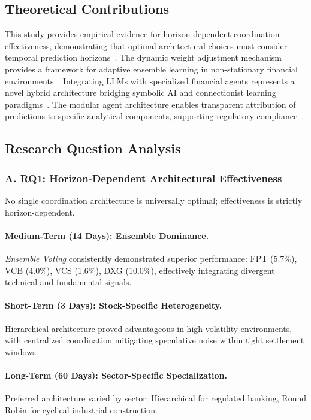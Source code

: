 \documentclass{ieeeaccess}
\begin{document}
\subsection{Theoretical Contributions}
This study provides empirical evidence for horizon-dependent coordination effectiveness, demonstrating that optimal architectural choices must consider temporal prediction horizons~\cite{hansen2001neural}. The dynamic weight adjustment mechanism provides a framework for adaptive ensemble learning in non-stationary financial environments~\cite{gama2014survey}. Integrating LLMs with specialized financial agents represents a novel hybrid architecture bridging symbolic AI and connectionist learning paradigms~\cite{bommasani2021foundation,brown2020language}. The modular agent architecture enables transparent attribution of predictions to specific analytical components, supporting regulatory compliance~\cite{arrieta2020explainable}.

\subsection{Research Question Analysis}

\subsubsection{A. RQ1: Horizon-Dependent Architectural Effectiveness}
No single coordination architecture is universally optimal; effectiveness is strictly horizon-dependent.

\paragraph{Medium-Term (14 Days): Ensemble Dominance.}
\textit{Ensemble Voting} consistently demonstrated superior performance: FPT (5.7\%), VCB (4.0\%), VCS (1.6\%), DXG (10.0\%), effectively integrating divergent technical and fundamental signals.

\paragraph{Short-Term (3 Days): Stock-Specific Heterogeneity.}
Hierarchical architecture proved advantageous in high-volatility environments, with centralized coordination mitigating speculative noise within tight settlement windows.

\paragraph{Long-Term (60 Days): Sector-Specific Specialization.}
Preferred architecture varied by sector: Hierarchical for regulated banking, Round Robin for cyclical industrial construction.
\end{document}
